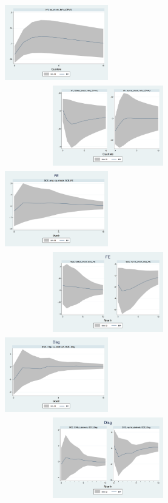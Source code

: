 \documentclass[]{article}
\begin{document}
	\begin{figure}[ht]
		\centering
		\includegraphics[width=4.5cm,height=3.5cm]{figures/CPIAU_ashocks_nmpM.png}  
		\includegraphics[width=9cm,height=3.5cm]{figures/CPIAU_ashocksM.png} \\
		\smallskip
		\includegraphics[width=4.5cm,height=3.5cm]{figures/SCEFE_ashocks_nmpM.png} 
		\includegraphics[width=9cm,height=3.5cm]{figures/SCEFE_ashocksM.png} \\
		\smallskip
		\includegraphics[width=4.5cm,height=3.5cm]{figures/SCEDisg_ab_ashocks_nmpM.png} 
		\includegraphics[width=9cm,height=3.5cm]{figures/SCEDisg_ab_ashocksM.png} \\

\end{figure}
\end{document}
